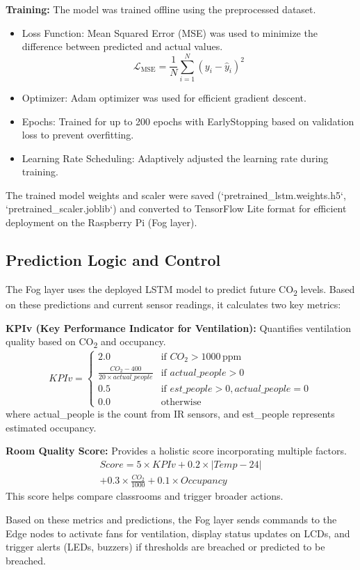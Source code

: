 \textbf{Training:} The model was trained offline using the preprocessed dataset.
\begin{itemize}
    \item Loss Function: Mean Squared Error (MSE) was used to minimize the difference between predicted and actual values.
    \begin{equation}
    \mathcal{L}_{\text{MSE}} = \frac{1}{N} \sum_{i=1}^{N} (y_i - \hat{y}_i)^2
    \label{eq:mse_methodology}
    \end{equation}
    \item Optimizer: Adam optimizer was used for efficient gradient descent.
    \item Epochs: Trained for up to 200 epochs with EarlyStopping based on validation loss to prevent overfitting.
    \item Learning Rate Scheduling: Adaptively adjusted the learning rate during training.
\end{itemize}
The trained model weights and scaler were saved (`pretrained_lstm.weights.h5`, `pretrained_scaler.joblib`) and converted to TensorFlow Lite format for efficient deployment on the Raspberry Pi (Fog layer).

\subsection{Prediction Logic and Control}

The Fog layer uses the deployed LSTM model to predict future CO\textsubscript{2} levels. Based on these predictions and current sensor readings, it calculates two key metrics:

\textbf{KPIv (Key Performance Indicator for Ventilation):} Quantifies ventilation quality based on CO\textsubscript{2} and occupancy.
\begin{equation}
KPIv = 
\begin{cases} 
2.0 & \text{if } CO_2 > 1000 \, \text{ppm} \\
\frac{CO_2 - 400}{20 \times actual\_people} & \text{if } actual\_people > 0 \\
0.5 & \text{if } est\_people > 0, actual\_people = 0 \\
0.0 & \text{otherwise}
\end{cases}
\label{eq:KPIv_methodology}
\end{equation}
where actual\_people is the count from IR sensors, and est\_people represents estimated occupancy.

\textbf{Room Quality Score:} Provides a holistic score incorporating multiple factors.
\begin{multline} 
    Score = 5 \times KPIv + 0.2 \times |Temp - 24| \\
    + 0.3 \times \frac{CO_2}{1000} + 0.1 \times Occupancy
    \label{eq:Score_methodology}
\end{multline}
This score helps compare classrooms and trigger broader actions.

Based on these metrics and predictions, the Fog layer sends commands to the Edge nodes to activate fans for ventilation, display status updates on LCDs, and trigger alerts (LEDs, buzzers) if thresholds are breached or predicted to be breached. 